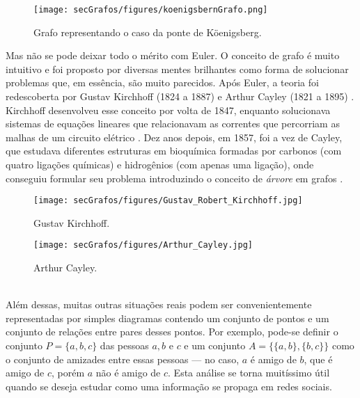 \begin{figure}[H]
	\begin{center}
		\texttt{[image: secGrafos/figures/koenigsbernGrafo.png]}
	\end{center}
	\caption{Grafo representando o caso da ponte de Köenigsberg.}
	\label{fig:koniGrafo}
\end{figure}

Mas não se pode deixar todo o mérito com Euler. O conceito de grafo é muito intuitivo e foi proposto por diversas mentes brilhantes como forma de solucionar problemas que, em essência, são muito parecidos. Após Euler, a teoria foi redescoberta por Gustav Kirchhoff (1824 a 1887) e Arthur Cayley (1821 a 1895) \cite{graphTheoryFHarary}. Kirchhoff desenvolveu esse conceito por volta de 1847, enquanto solucionava sistemas de equações lineares que relacionavam as correntes que percorriam as malhas de um circuito elétrico \cite{kirchhoff1847ueber}. Dez anos depois, em 1857, foi a vez de Cayley, que estudava diferentes estruturas em bioquímica formadas por carbonos (com quatro ligações químicas) e hidrogênios (com apenas uma ligação), onde conseguiu formular seu problema introduzindo o conceito de \textit{árvore} em grafos \cite{cayley1897theory}.  

\begin{minipage}{0.45 \linewidth}
	\begin{figure}[H]
		\begin{center}
			\texttt{[image: secGrafos/figures/Gustav\_Robert\_Kirchhoff.jpg]}
		\end{center}
		\caption{Gustav Kirchhoff.}
		\label{fig:kirchhoff}
	\end{figure}
\end{minipage}
\hspace{0.1cm}
\begin{minipage}{0.45 \linewidth}
	\begin{figure}[H]
		\begin{center}
			\texttt{[image: secGrafos/figures/Arthur\_Cayley.jpg]}
		\end{center}
		\caption{Arthur Cayley.}
		\label{fig:cayley}
	\end{figure}
\end{minipage}
\\

Além dessas, muitas outras situações reais podem ser convenientemente representadas por simples diagramas contendo um conjunto de pontos e um conjunto de relações entre pares desses pontos. Por exemplo, pode-se definir o conjunto $P = \{a,b,c\}$ das pessoas $a, b$ e $c$ e um conjunto $A = \{\{a,b\}, \{b,c\}\}$ como o conjunto de amizades entre essas pessoas --- no caso, $a$ é amigo de $b$, que é amigo de $c$, porém $a$ não é amigo de $c$. 
Esta análise se torna muitíssimo útil quando se deseja estudar como uma informação se propaga em redes sociais.

